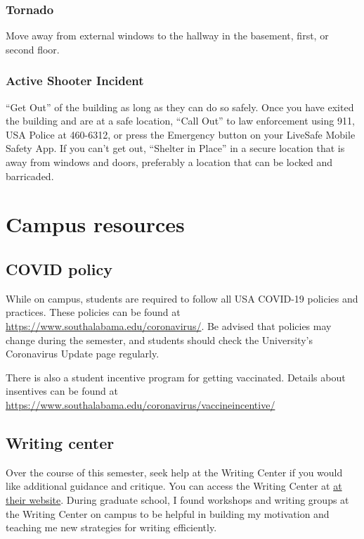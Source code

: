 \documentclass[11pt,]{article}
\begin{document}
\hypertarget{tornado}{%
\subsubsection{Tornado}\label{tornado}}

Move away from external windows to the hallway in the basement, first,
or second floor.

\hypertarget{active-shooter-incident}{%
\subsubsection{Active Shooter Incident}\label{active-shooter-incident}}

``Get Out'' of the building as long as they can do so safely. Once you
have exited the building and are at a safe location, ``Call Out'' to law
enforcement using 911, USA Police at 460-6312, or press the Emergency
button on your LiveSafe Mobile Safety App. If you can't get out,
``Shelter in Place'' in a secure location that is away from windows and
doors, preferably a location that can be locked and barricaded.

\hypertarget{campus-resources}{%
\section{Campus resources}\label{campus-resources}}

\hypertarget{covid-policy}{%
\subsection{COVID policy}\label{covid-policy}}

While on campus, students are required to follow all USA COVID-19
policies and practices. These policies can be found at
\url{https://www.southalabama.edu/coronavirus/}. Be advised that
policies may change during the semester, and students should check the
University's Coronavirus Update page regularly.

There is also a student incentive program for getting vaccinated.
Details about insentives can be found at
\url{https://www.southalabama.edu/coronavirus/vaccineincentive/}

\hypertarget{writing-center}{%
\subsection{Writing center}\label{writing-center}}

Over the course of this semester, seek help at the Writing Center if you
would like additional guidance and critique. You can access the Writing
Center at
\href{https://www.southalabama.edu/departments/academicsuccess/cae/how.it.works.html}{at
their website}. During graduate school, I found workshops and writing
groups at the Writing Center on campus to be helpful in building my
motivation and teaching me new strategies for writing efficiently.
\end{document}
